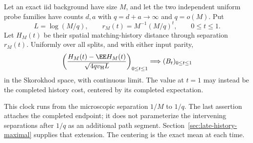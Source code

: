 \documentclass[11pt,letterpaper]{article}
\begin{document}
\begin{theorem}
\label{thm:all-sparse-history-FCLT}
Let an exact iid background have size $M$, and let the two
independent uniform probe families have counts $d,a$ with
$q=d+a\to\infty$ and $q=o(M)$. Put
\[
 L=\log(M/q),\qquad
 r_M(t)=M^{-1}(M/q)^t,\qquad 0\le t\le1.
\]
Let $H_M(t)$ be their spatial matching-history distance
through separation $r_M(t)$. Uniformly over all splits,
and with either input parity,
\begin{equation}\label{eq:all-sparse-history-FCLT}
 \left(\frac{H_M(t)-\EE H_M(t)}
                      {\sqrt{4qv_{\rm H}L}}\right)_{0\le t\le1}
       \Longrightarrow (B_t)_{0\le t\le1}
\end{equation}
in the Skorokhod space, with continuous limit.
The value at $t=1$ may instead be the completed history cost,
centered by its completed expectation.

This clock runs from the microscopic separation $1/M$ to
$1/q$. The last assertion attaches the completed endpoint;
it does not parameterize the intervening separations after
$1/q$ as an additional path segment.
Section~\ref{sec:late-history-maximal} supplies that extension.
The centering is the exact mean at each time.
\end{theorem}
\end{document}
